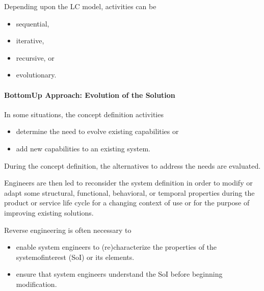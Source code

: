 \documentclass[letterpaper,10pt,english]{jupyterBook}
\begin{document}
\sphinxAtStartPar
Depending upon the LC model,  activities can be
\begin{itemize}
\item {} 
\sphinxAtStartPar
sequential,

\item {} 
\sphinxAtStartPar
iterative,

\item {} 
\sphinxAtStartPar
recursive, or

\item {} 
\sphinxAtStartPar
evolutionary.

\end{itemize}


\paragraph{Bottom\sphinxhyphen{}Up Approach: Evolution of the Solution}
\label{\detokenize{SE/sebok:bottom-up-approach-evolution-of-the-solution}}
\sphinxAtStartPar
In some situations, the concept definition activities
\begin{itemize}
\item {} 
\sphinxAtStartPar
determine the need to evolve existing capabilities or

\item {} 
\sphinxAtStartPar
add new capabilities to an existing system.

\end{itemize}

\sphinxAtStartPar
During the concept definition, the alternatives to address the needs are evaluated.

\sphinxAtStartPar
Engineers are then led to reconsider the system definition in order to modify or adapt some structural, functional, behavioral, or temporal properties during the product or service life cycle for a changing context of use or for the purpose of improving existing solutions.

\sphinxAtStartPar
Reverse engineering is often necessary to
\begin{itemize}
\item {} 
\sphinxAtStartPar
enable system engineers to (re)characterize the properties of the
system\sphinxhyphen{}of\sphinxhyphen{}interest (SoI) or its elements.

\item {} 
\sphinxAtStartPar
ensure that system engineers understand the SoI before beginning modification.

\end{itemize}
\end{document}
